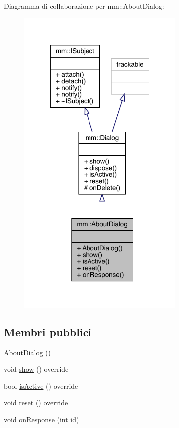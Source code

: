 Diagramma di collaborazione per mm\+:\+:About\+Dialog\+:
\nopagebreak
\begin{figure}[H]
\begin{center}
\leavevmode
\includegraphics[width=228pt]{da/dca/classmm_1_1_about_dialog__coll__graph}
\end{center}
\end{figure}
\subsection*{Membri pubblici}
\begin{DoxyCompactItemize}
\item 
\mbox{\hyperlink{classmm_1_1_about_dialog_a489ffce563c6dae1dfef30518a778197}{About\+Dialog}} ()
\item 
void \mbox{\hyperlink{classmm_1_1_about_dialog_a9e06dc12f6950b74ccf6ccece693f108}{show}} () override
\item 
bool \mbox{\hyperlink{classmm_1_1_about_dialog_adc8aec0378d9d146c78eaf9a204dbf27}{is\+Active}} () override
\item 
void \mbox{\hyperlink{classmm_1_1_about_dialog_a21f5b0a7c9d8e43baab78e073d7ade2b}{reset}} () override
\item 
void \mbox{\hyperlink{classmm_1_1_about_dialog_a9a5feecb03e737d3bdbbf2a97dd7fbc4}{on\+Response}} (int id)
\end{DoxyCompactItemize}
